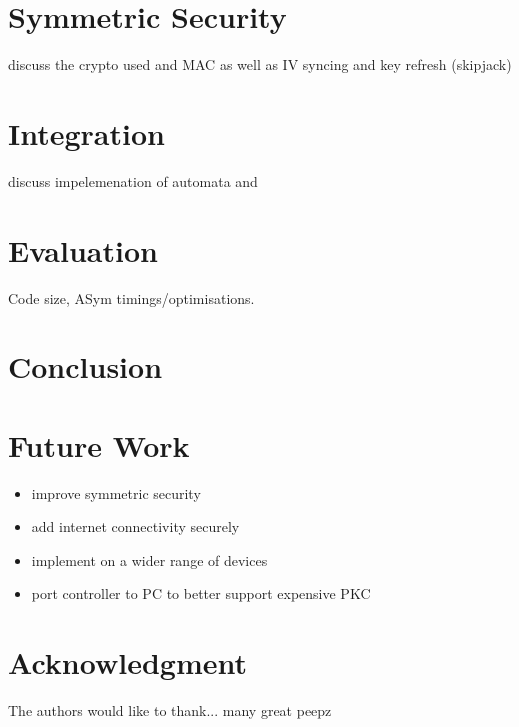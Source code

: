 \documentclass[conference]{./sty/IEEEtran}
\begin{document}
\section{Symmetric Security} %
\label{sec:symmetric_security}
discuss the crypto used and MAC
as well as IV syncing and key refresh (skipjack)
\section{Integration} %
\label{sec:integration}
discuss impelemenation of automata and 

\section{Evaluation} %
\label{sec:evaluation}
Code size, ASym timings/optimisations.

\section{Conclusion}


\section{Future Work} %
\label{sec:future_work}

\begin{itemize}
  \item improve symmetric security
  \item add internet connectivity securely
  \item implement on a wider range of devices
  \item port controller to PC to better support expensive PKC
\end{itemize}



\section*{Acknowledgment}


The authors would like to thank... many great peepz





\end{document}
